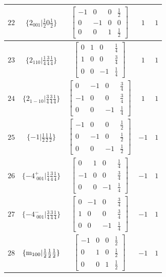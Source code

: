 \documentclass[fleqn,8pt]{jsarticle}
\begin{document}
\begin{longtable}{ccccc}
$ 22 $ & $ \{2{}_{001}|\frac{1}{2} 0 \frac{1}{2}\} $ & $ \begin{bmatrix} -1 & 0 & 0 & \frac{1}{2} \\ 0 & -1 & 0 & 0 \\ 0 & 0 & 1 & \frac{1}{2} \end{bmatrix} $ & $ 1 $ & $ 1 $ \\ \hline
$ 23 $ & $ \{2{}_{110}|\frac{1}{4} \frac{3}{4} \frac{1}{4}\} $ & $ \begin{bmatrix} 0 & 1 & 0 & \frac{1}{4} \\ 1 & 0 & 0 & \frac{3}{4} \\ 0 & 0 & -1 & \frac{1}{4} \end{bmatrix} $ & $ 1 $ & $ 1 $ \\ \hline
$ 24 $ & $ \{2{}_{1-10}|\frac{3}{4} \frac{3}{4} \frac{1}{4}\} $ & $ \begin{bmatrix} 0 & -1 & 0 & \frac{3}{4} \\ -1 & 0 & 0 & \frac{3}{4} \\ 0 & 0 & -1 & \frac{1}{4} \end{bmatrix} $ & $ 1 $ & $ 1 $ \\ \hline
$ 25 $ & $ \{-1|\frac{1}{2} \frac{1}{2} \frac{1}{2}\} $ & $ \begin{bmatrix} -1 & 0 & 0 & \frac{1}{2} \\ 0 & -1 & 0 & \frac{1}{2} \\ 0 & 0 & -1 & \frac{1}{2} \end{bmatrix} $ & $ -1 $ & $ 1 $ \\ \hline
$ 26 $ & $ \{-4^{+}_{\,\,001}|\frac{1}{4} \frac{3}{4} \frac{1}{4}\} $ & $ \begin{bmatrix} 0 & 1 & 0 & \frac{1}{4} \\ -1 & 0 & 0 & \frac{3}{4} \\ 0 & 0 & -1 & \frac{1}{4} \end{bmatrix} $ & $ -1 $ & $ 1 $ \\ \hline
$ 27 $ & $ \{-4^{-}_{\,\,001}|\frac{3}{4} \frac{3}{4} \frac{1}{4}\} $ & $ \begin{bmatrix} 0 & -1 & 0 & \frac{3}{4} \\ 1 & 0 & 0 & \frac{3}{4} \\ 0 & 0 & -1 & \frac{1}{4} \end{bmatrix} $ & $ -1 $ & $ 1 $ \\ \hline
$ 28 $ & $ \{{\rm m}_{100}|\frac{1}{2} \frac{1}{2} \frac{1}{2}\} $ & $ \begin{bmatrix} -1 & 0 & 0 & \frac{1}{2} \\ 0 & 1 & 0 & \frac{1}{2} \\ 0 & 0 & 1 & \frac{1}{2} \end{bmatrix} $ & $ -1 $ & $ 1 $ \\ \hline

\end{longtable}
\end{document}
